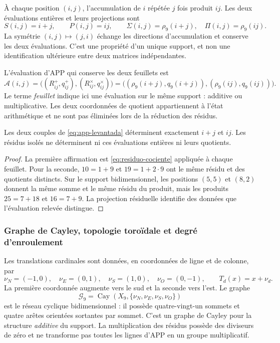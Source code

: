 À chaque position \((i,j)\), l'accumulation de \(i\) répétée \(j\) fois produit \(ij\). Les deux évaluations entières et leurs projections sont
\[
 S(i,j)=i+j,\qquad P(i,j)=ij,\qquad
 \Sigma(i,j)=\rho_9(i+j),\quad \Pi(i,j)=\rho_9(ij).
\]
La symétrie \((i,j)\mapsto(j,i)\) échange les directions d'accumulation et conserve les deux évaluations. C'est une propriété d'un unique support, et non une identification ultérieure entre deux matrices indépendantes.

\begin{definition}
L'évaluation d'APP qui conserve les deux feuillets est
\begin{equation}
 \mathcal A(i,j)=
 \bigl((R^+_{ij},q^+_{ij}),(R^\times_{ij},q^\times_{ij})\bigr)
 =\bigl((\rho_9(i+j),q_9(i+j)),(\rho_9(ij),q_9(ij))\bigr).
 \label{eq:app-levantada}
\end{equation}
Le terme \emph{feuillet} indique ici une évaluation sur le même support : additive ou multiplicative. Les deux coordonnées de quotient appartiennent à l'état arithmétique et ne sont pas éliminées lors de la réduction des résidus.
\end{definition}



\begin{proposition}
Les deux couples de \eqref{eq:app-levantada} déterminent exactement \(i+j\) et \(ij\). Les résidus isolés ne déterminent ni ces évaluations entières ni leurs quotients.
\end{proposition}
\begin{proof}
La première affirmation est \eqref{eq:residuo-cociente} appliquée à chaque feuillet. Pour la seconde, \(10=1+9\) et \(19=1+2\cdot9\) ont le même résidu et des quotients distincts. Sur le support bidimensionnel, les positions \((5,5)\) et \((8,2)\) donnent la même somme et le même résidu du produit, mais les produits \(25=7+18\) et \(16=7+9\). La projection résiduelle identifie des données que l'évaluation relevée distingue.
\end{proof}

\subsubsection{Graphe de Cayley, topologie toroïdale et degré d'enroulement}

Les translations cardinales sont données, en coordonnées de ligne et de colonne, par
\[
 \nu_N=(-1,0),\quad\nu_E=(0,1),\quad
 \nu_S=(1,0),\quad\nu_O=(0,-1),\qquad T_d(x)=x+\nu_d.
\]
La première coordonnée augmente vers le sud et la seconde vers l'est. Le graphe
\[
 \mathscr G_9=\operatorname{Cay}(X_9,\{\nu_N,\nu_E,\nu_S,\nu_O\})
\]
est le réseau cyclique bidimensionnel : il possède quatre-vingt-un sommets et quatre arêtes orientées sortantes par sommet. C'est un graphe de Cayley pour la structure \emph{additive} du support. La multiplication des résidus possède des diviseurs de zéro et ne transforme pas toutes les lignes d'APP en un groupe multiplicatif.

